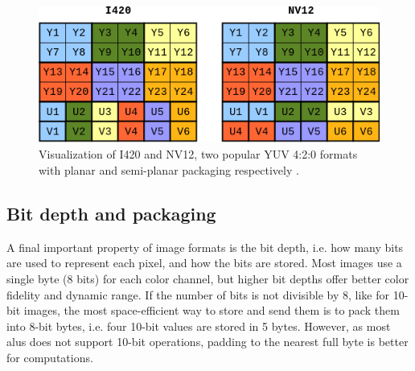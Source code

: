 \begin{figure}[H]
    \centering
    \includegraphics[width=.8\textwidth]{figures/debayer/YUV_packaging.png}
    \caption{Visualization of I420 and NV12, two popular YUV 4:2:0 formats with planar and semi-planar packaging respectively \cite{baranYUVFormats2018}.}
    \label{fig:image_packaging}
\end{figure}

\subsection{Bit depth and packaging}
A final important property of image formats is the bit depth, i.e.
how many bits are used to represent each pixel, and how the bits are stored.
Most images use a single byte (8 bits) for each color channel, but higher bit depths offer better color fidelity and dynamic range.
If the number of bits is not divisible by 8, like for 10-bit images, the most space-efficient way to store and send them is to pack them into 8-bit bytes, i.e.
four 10-bit values are stored in 5 bytes.
However, as most \glspl{alu} does not support 10-bit operations, padding to the nearest full byte is better for computations.